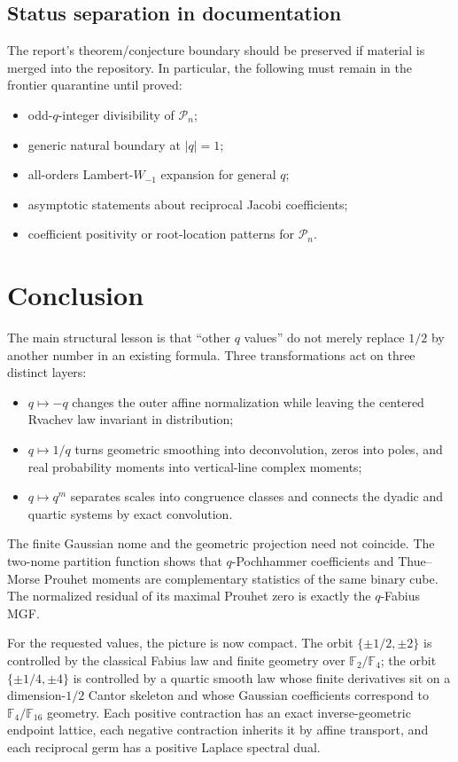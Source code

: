 \documentclass[11pt,oneside]{article}
\numberwithin{equation}{section}
\theoremstyle{definition}
\theoremstyle{remark}
\begin{document}
\subsection{Status separation in documentation}

The report's theorem/conjecture boundary should be preserved if material is
merged into the repository.  In particular, the following must remain in the
frontier quarantine until proved:
\begin{itemize}
\item odd-$q$-integer divisibility of $\mathcal P_n$;
\item generic natural boundary at $|q|=1$;
\item all-orders Lambert-$W_{-1}$ expansion for general $q$;
\item asymptotic statements about reciprocal Jacobi coefficients;
\item coefficient positivity or root-location patterns for $\mathcal P_n$.
\end{itemize}

\section{Conclusion}
\label{sec:conclusion}

The main structural lesson is that ``other $q$ values'' do not merely replace
$1/2$ by another number in an existing formula.  Three transformations act on
three distinct layers:
\begin{itemize}
\item $q\mapsto-q$ changes the outer affine normalization while leaving the
      centered Rvachev law invariant in distribution;
\item $q\mapsto1/q$ turns geometric smoothing into deconvolution, zeros into
      poles, and real probability moments into vertical-line complex moments;
\item $q\mapsto q^m$ separates scales into congruence classes and connects the
      dyadic and quartic systems by exact convolution.
\end{itemize}
The finite Gaussian nome and the geometric projection need not coincide.  The
two-nome partition function shows that $q$-Pochhammer coefficients and
Thue--Morse Prouhet moments are complementary statistics of the same binary
cube.  The normalized residual of its maximal Prouhet zero is exactly the
$q$-Fabius MGF.

For the requested values, the picture is now compact.  The orbit
$\{\pm1/2,\pm2\}$ is controlled by the classical Fabius law and finite geometry
over $\mathbb F_2/\mathbb F_4$; the orbit $\{\pm1/4,\pm4\}$ is controlled by a
quartic smooth law whose finite derivatives sit on a dimension-$1/2$ Cantor
skeleton and whose Gaussian coefficients correspond to
$\mathbb F_4/\mathbb F_{16}$ geometry.  Each positive contraction has an exact
inverse-geometric endpoint lattice, each negative contraction inherits it by
affine transport, and each reciprocal germ has a positive Laplace spectral
dual.
\end{document}
